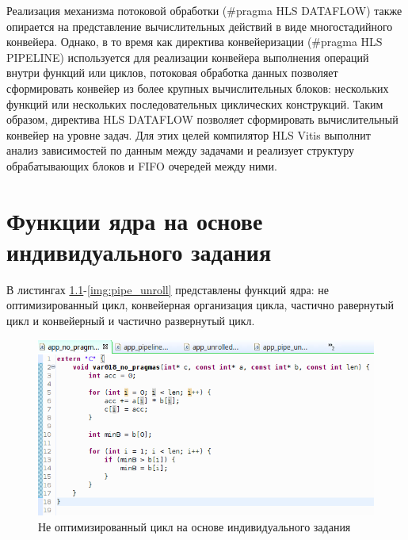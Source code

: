 Реализация механизма потоковой обработки (\#pragma HLS DATAFLOW) также опирается на представление вычислительных действий в виде многостадийного конвейера. Однако, в то время как директива конвейеризации (\#pragma HLS PIPELINE) используется для реализации конвейера выполнения операций внутри функций или циклов, потоковая обработка данных позволяет сформировать конвейер из более крупных вычислительных блоков: нескольких функций или нескольких последовательных циклических конструкций. Таким образом, директива HLS DATAFLOW позволяет сформировать вычислительный конвейер на уровне задач. Для этих целей компилятор HLS Vitis выполнит анализ зависимостей по данным между задачами и реализует структуру обрабатывающих блоков и FIFO очередей между ними.

\chapter{Функции ядра на основе индивидуального задания}

В листингах \ref{img:no_pragmas}-\ref{img:pipe_unroll} представлены функций ядра: не оптимизированный цикл, конвейерная организация цикла, частично равернутый цикл и конвейерный и частично развернутый цикл.

\begin{figure}[H]
	\begin{center}
		\includegraphics[scale=0.6]{img/no_pragmas.png}
	\end{center}
	\captionsetup{justification=centering}
	\caption{Не оптимизированный цикл на основе индивидуального задания}
	\label{img:no_pragmas}
\end{figure}

